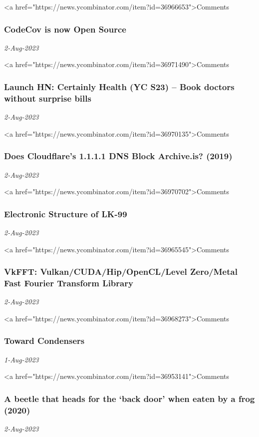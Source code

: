 <a href="https://news.ycombinator.com/item?id=36966653">Comments
\subsubsection{CodeCov is now Open Source \href{https://about.codecov.io/blog/codecov-is-now-open-source/}{}}
\textit{2-Aug-2023}

<a href="https://news.ycombinator.com/item?id=36971490">Comments
\subsubsection{Launch HN: Certainly Health (YC S23) – Book doctors without surprise bills \href{https://news.ycombinator.com/item?id=36970135}{}}
\textit{2-Aug-2023}

<a href="https://news.ycombinator.com/item?id=36970135">Comments
\subsubsection{Does Cloudflare’s 1.1.1.1 DNS Block Archive.is? (2019) \href{https://jarv.is/notes/cloudflare-dns-archive-is-blocked/}{}}
\textit{2-Aug-2023}

<a href="https://news.ycombinator.com/item?id=36970702">Comments
\subsubsection{Electronic Structure of LK-99 \href{https://arxiv.org/abs/2308.00676}{}}
\textit{2-Aug-2023}

<a href="https://news.ycombinator.com/item?id=36965545">Comments
\subsubsection{VkFFT: Vulkan/CUDA/Hip/OpenCL/Level Zero/Metal Fast Fourier Transform Library \href{https://github.com/DTolm/VkFFT}{}}
\textit{2-Aug-2023}

<a href="https://news.ycombinator.com/item?id=36968273">Comments
\subsubsection{Toward Condensers \href{https://openjdk.org/projects/leyden/notes/03-toward-condensers}{}}
\textit{1-Aug-2023}

<a href="https://news.ycombinator.com/item?id=36953141">Comments
\subsubsection{A beetle that heads for the ‘back door’ when eaten by a frog (2020) \href{https://www.smithsonianmag.com/smart-news/when-beetle-gets-eaten-frog-it-forces-its-way-out-back-door-180975484/}{}}
\textit{2-Aug-2023}

